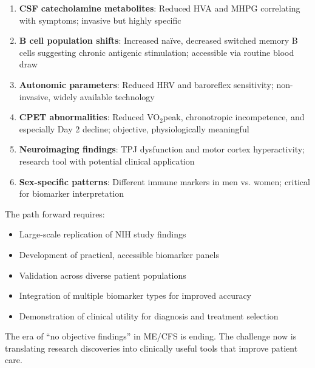 \begin{enumerate}
    \item \textbf{CSF catecholamine metabolites}: Reduced HVA and MHPG correlating with symptoms; invasive but highly specific

    \item \textbf{B cell population shifts}: Increased naïve, decreased switched memory B cells suggesting chronic antigenic stimulation; accessible via routine blood draw

    \item \textbf{Autonomic parameters}: Reduced HRV and baroreflex sensitivity; non-invasive, widely available technology

    \item \textbf{CPET abnormalities}: Reduced VO$_2$peak, chronotropic incompetence, and especially Day 2 decline; objective, physiologically meaningful

    \item \textbf{Neuroimaging findings}: TPJ dysfunction and motor cortex hyperactivity; research tool with potential clinical application

    \item \textbf{Sex-specific patterns}: Different immune markers in men vs. women; critical for biomarker interpretation
\end{enumerate}

The path forward requires:
\begin{itemize}
    \item Large-scale replication of NIH study findings
    \item Development of practical, accessible biomarker panels
    \item Validation across diverse patient populations
    \item Integration of multiple biomarker types for improved accuracy
    \item Demonstration of clinical utility for diagnosis and treatment selection
\end{itemize}

The era of ``no objective findings'' in ME/CFS is ending. The challenge now is translating research discoveries into clinically useful tools that improve patient care.

